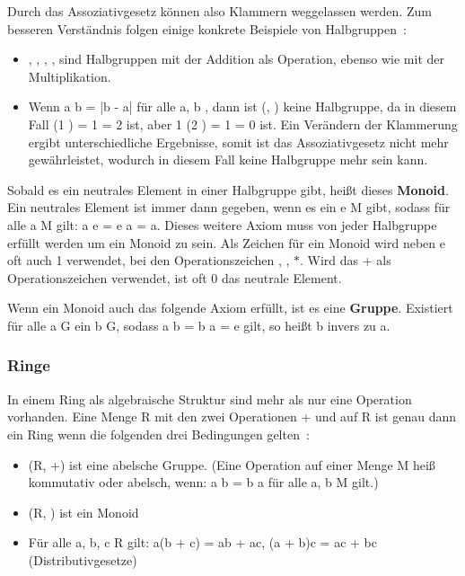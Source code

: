 			Durch das Assoziativgesetz können also Klammern weggelassen werden. Zum besseren Verständnis folgen einige konkrete Beispiele von Halbgruppen~\cite{Erste:Hilfe:in:Linearer:Algebra}:
			
			\begin{itemize}
				\item {}, , , ,  sind Halbgruppen mit der Addition als Operation, ebenso wie mit der Multiplikation.
				\item Wenn a \mycirc b = |b - a| für alle a, b \myin \myMenge{Z}, dann ist (, \mycircOhne) keine Halbgruppe, da in diesem Fall (1 ) \mycirc 3 = 1  = 2 ist, aber 1 \mycirc (2 ) = 1  = 0 ist. Ein Verändern der Klammerung ergibt unterschiedliche Ergebnisse, somit ist das Assoziativgesetz nicht mehr gewährleistet, wodurch  in diesem Fall keine Halbgruppe mehr sein kann.
			\end{itemize}

			Sobald es ein neutrales Element in einer Halbgruppe gibt, heißt dieses \textbf{Monoid}. Ein neutrales Element ist immer dann gegeben, wenn es ein e \myin M gibt, sodass für alle a \myin M gilt: a \mycirc e = e \mycirc a = a. Dieses weitere Axiom muss von jeder Halbgruppe erfüllt werden um ein Monoid zu sein. Als Zeichen für ein Monoid wird neben e oft auch 1 verwendet, bei den Operationszeichen \mycircOhne, \mycdotOhne, $*$. Wird das + als Operationszeichen verwendet, ist oft 0 das neutrale Element.~\cite{Erste:Hilfe:in:Linearer:Algebra}

			Wenn ein Monoid auch das folgende Axiom erfüllt, ist es eine \textbf{Gruppe}. Existiert für alle a \myin G ein b \myin G, sodass a \mycirc b = b \mycirc a = e gilt, so heißt b invers zu a.~\cite{Erste:Hilfe:in:Linearer:Algebra}
		
		\subsubsection{Ringe}
			In einem Ring als algebraische Struktur sind mehr als nur eine Operation vorhanden. Eine Menge R mit den zwei Operationen + und \mycdot auf R ist genau dann ein Ring wenn die folgenden drei Bedingungen gelten~\cite{Erste:Hilfe:in:Linearer:Algebra}:
			
			\begin{itemize}
				\item (R, +) ist eine abelsche Gruppe. (Eine Operation \mycirc auf einer Menge M heiß kommutativ oder abelsch, wenn: a \mycirc b = b \mycirc a für alle a, b \myin M gilt.)
				\item (R, \mycdotOhne) ist ein Monoid
				\item Für alle a, b, c \myin R gilt: a(b + c) = ab + ac, (a + b)c = ac + bc (Distributivgesetze)
			\end{itemize}
			
